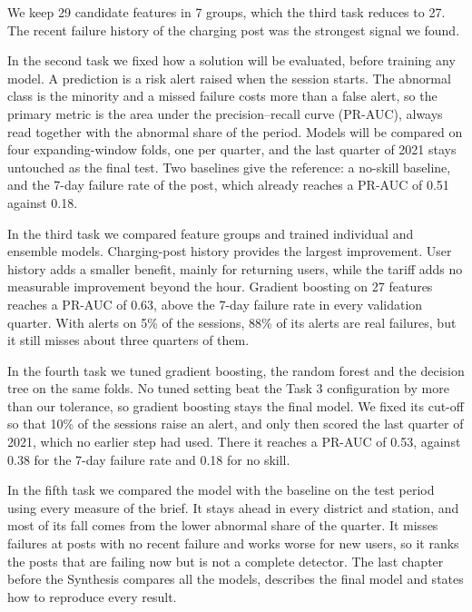 \documentclass[12pt,a4paper,openany]{report}
\begin{document}
We keep 29 candidate features in 7 groups, which the third task reduces to 27. The recent failure history of the
charging post was the strongest signal we found.

In the second task we fixed how a solution will be evaluated, before training any model. A prediction is a risk
alert raised when the session starts. The abnormal class is the minority and a missed failure costs more than a
false alert, so the primary metric is the area under the precision--recall curve (PR-AUC), always read together
with the abnormal share of the period. Models will be compared on four expanding-window folds, one per quarter,
and the last quarter of 2021 stays untouched as the final test. Two baselines give the reference: a no-skill
baseline, and the 7-day failure rate of the post, which already reaches a PR-AUC of 0.51 against 0.18.

In the third task we compared feature groups and trained individual and ensemble models. Charging-post history
provides the largest improvement. User history adds a smaller benefit, mainly for returning users, while the tariff
adds no measurable improvement beyond the hour. Gradient boosting on 27 features reaches a PR-AUC of 0.63, above
the 7-day failure rate in every validation quarter. With alerts on 5\% of the sessions, 88\% of its alerts are real
failures, but it still misses about three quarters of them.

In the fourth task we tuned gradient boosting, the random forest and the decision tree on the same folds. No
tuned setting beat the Task 3 configuration by more than our tolerance, so gradient boosting stays the final
model. We fixed its cut-off so that 10\% of the sessions raise an alert, and only then scored the last quarter of
2021, which no earlier step had used. There it reaches a PR-AUC of 0.53, against 0.38 for the 7-day failure rate
and 0.18 for no skill.

In the fifth task we compared the model with the baseline on the test period using every measure of the brief. It
stays ahead in every district and station, and most of its fall comes from the lower abnormal share of the quarter.
It misses failures at posts with no recent failure and works worse for new users, so it ranks the posts that are
failing now but is not a complete detector. The last chapter before the Synthesis compares all the models, describes
the final model and states how to reproduce every result.

{\makeatletter%
 \renewcommand{\@makeschapterhead}[1]{{\parindent\z@\raggedright\normalfont\Huge\bfseries #1\par\nobreak\vskip 30\p@}}
 \patchcmd{\l@chapter}{\vskip 1.0em \@plus\p@}{\vskip 0.2em \@plus\p@}{}{}
 \tableofcontents\makeatother}
\listoffigures
\listoftables
\end{document}
